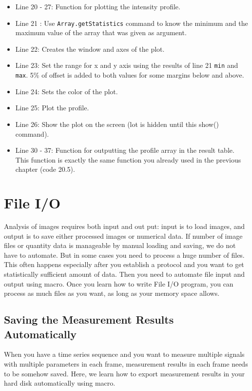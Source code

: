 \documentclass[11pt,a4paper,oneside]{report}
\newcommand{\ilcom}[1]{\texttt{\small#1}}
\begin{document}
\begin{itemize}
\item Line 20 - 27: Function for plotting the intensity profile.
\item Line 21 : Use \ilcom{Array.getStatistics} command to know the minimum and
the maximum value of the array that was given as argument.
\item Line 22: Creates the window and axes of the plot. 
\item Line 23: Set the range for x and y axis using the results of line 21
\ilcom{min} and \ilcom{max}. 5\% of offset is added to both values for some
margins below and above.
\item Line 24: Sets the color of the plot. 
\item Line 25: Plot the profile. 
\item Line 26: Show the plot on the screen (lot is hidden until this show()
command).

\item Line 30 - 37: Function for outputting the profile array in the result
table. This function is exactly the same function you already used in the
previous chapter (code 20.5).

\end{itemize}

\newpage

\section{File I/O}

Analysis of images requires both input and out put: input is to load images, 
and output is  to save either processed images or numerical data. 
If number of image files or quantity data is manageable by manual loading and saving, 
we do not have to automate. But in some cases you need to process a huge number of files. 
This often happens especially after you establish a protocol and you want to get 
statistically sufficient amount of data. Then you need to automate file input and output using macro. 
Once you learn how to write File I/O program, you can process as much files as you want, 
as long as your memory space allows.

\subsection{Saving the Measurement Results Automatically}

When you have a time series sequence and you want to measure multiple signals with 
multiple parameters in each frame, measurement results in each frame needs to be somehow saved. 
Here, we learn how to export measurement results in your hard disk automatically using macro. 
\end{document}
